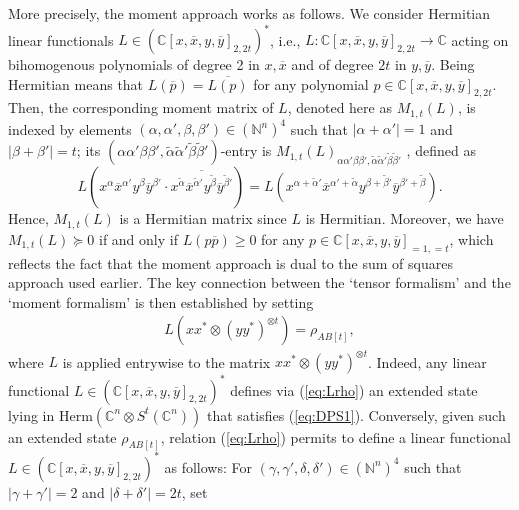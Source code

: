 \documentclass[11pt]{article}
\newcommand{\N}{\ensuremath{\mathbb{N}}}   %
\newcommand{\C}{\ensuremath{\mathbb{C}}} %
\newcommand{\Herm}{\mathrm{Herm}}
\newcommand{\ox}{\overline x}
\newcommand{\oy}{\overline y}
\newcommand{\ot}{\otimes}
\newcommand{\ui}{\underline{i}}
\newcommand{\uj}{\underline{j}}
\theoremstyle{plain}
\begin{document}
More precisely, the moment approach works as follows. We consider Hermitian linear functionals $L\in (\C[x,\ox,y,\oy]_{2,2t})^*$, i.e., $L:\C[x,\ox,y,\oy]_{2,2t}\to \C$ acting  on bihomogenous polynomials of degree 2 in $x,\ox$ and of degree $2t$ in $y,\oy$. Being Hermitian means that $L(\overline p)=\overline { L(p)}$ for any polynomial $p\in \C[x,\ox,y,\oy]_{2,2t}$.
Then, the corresponding moment matrix of $L$, denoted here as $M_{1,t}(L)$, is indexed by 
elements  $(\alpha,\alpha',\beta,\beta')\in (\N^n)^4$ such that $|\alpha+\alpha'|=1$ and $|\beta+\beta'|=t$;
 its $(\alpha\alpha'\beta\beta',\tilde \alpha\tilde\alpha'\tilde\beta\tilde\beta')$-entry is  $M_{1,t}(L)_{\alpha\alpha'\beta\beta',\tilde\alpha\tilde\alpha'\tilde\beta\tilde\beta'}$ , defined as 
$$
L( x^\alpha \ox^{\alpha'} y^\beta \oy ^{\beta'} \cdot 
\overline { x^{\tilde \alpha} \ox^{\tilde \alpha'} y^{\tilde \beta} \oy^{\tilde \beta'}  })
= L(x^{\alpha+\tilde\alpha'}\ox^{\alpha'+\tilde\alpha}y^{\beta+\tilde\beta'}\oy^{\beta'+\tilde\beta}).$$ 
Hence, $M_{1,t}(L)$ is a Hermitian matrix since $L$ is Hermitian. Moreover, we have  $M_{1,t}(L)\succeq 0$ if and only if $L(p\overline p)\ge 0$ for any $p\in \C[x,\ox,y,\oy]_{=1,=t}$, which reflects the fact that the moment approach is dual to the sum of squares approach used earlier.
The key connection between the `tensor formalism' and the `moment formalism' is then established by setting 
\begin{align}\label{eq:Lrho}
 L(xx^*\ot(yy^*)^{\ot t})=\rho_{AB[t]},
 \end{align}
 where $L$ is applied entrywise to the matrix $  xx^*\ot(yy^*)^{\ot t}$.
  Indeed, any linear functional $L\in (\C[x,\ox,y,\oy]_{2,2t})^*$ defines via (\ref{eq:Lrho}) an extended state lying in $\Herm(\C^n\ot S^t(\C^n))$ that satisfies (\ref{eq:DPS1}). Conversely,  given such an extended state $\rho_{AB[t]}$,  relation (\ref{eq:Lrho})  permits to define a linear functional $L\in (\C[x,\ox,y,\oy]_{2,2t})^*$ as follows: For $(\gamma,\gamma',\delta,\delta')\in (\N^n)^4$ such that $|\gamma+\gamma'|=2$ and $|\delta+\delta'|=2t$, set
\end{document}
